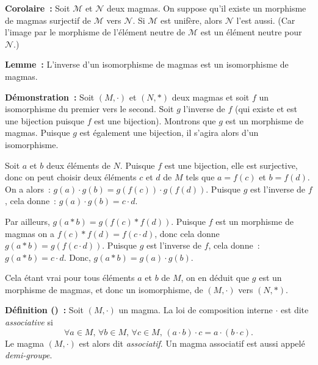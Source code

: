     \hfill \square

\medskip

\noindent\textbf{Corolaire :} Soit $\mathcal{M}$ et $\mathcal{N}$ deux magmas. 
    On suppose qu'il existe un morphisme de magmas surjectif de $\mathcal{M}$ vers $\mathcal{N}$. 
    Si $\mathcal{M}$ est unifère, alors $\mathcal{N}$ l'est aussi. 
    (Car l'image par le morphisme de l'élément neutre de $\mathcal{M}$ est un élément neutre pour $\mathcal{N}$.)

\medskip

\noindent\textbf{Lemme :} L'inverse d'un isomorphisme de magmas est un isomorphisme de magmas.

\medskip

\noindent\textbf{Démonstration :} Soit $\left(M, \cdot \right)$ et $\left(N, \ast \right)$ deux magmas et soit $f$ un isomorphisme du premier vers le second. 
    Soit $g$ l'inverse de $f$ (qui existe et est une bijection puisque $f$ est une bijection). 
    Montrons que $g$ est un morphisme de magmas. 
    Puisque $g$ est également une bijection, il s'agira alors d'un isomorphisme. 

    Soit $a$ et $b$ deux éléments de $N$. 
    Puisque $f$ est une bijection, elle est surjective, donc on peut choisir deux éléments $c$ et $d$ de $M$ tels que $a = f(c)$ et $b = f(d)$. 
    On a alors : $g(a) \cdot g(b) = g(f(c)) \cdot g(f(d))$.
    Puisque $g$ est l'inverse de $f$, cela donne : $g(a) \cdot g(b) = c \cdot d$. 

    Par ailleurs, $g(a \ast b) = g(f(c) \ast f(d))$. 
    Puisque $f$ est un morphisme de magmas on a $f(c) \ast f(d) = f (c \cdot d)$, donc cela donne $g(a \ast b) = g(f(c \cdot d))$.
    Puisque $g$ est l'inverse de $f$, cela donne : $g(a \ast b) = c \cdot d$. 
    Donc, $g(a \ast b) = g(a) \cdot g(b)$. 

    Cela étant vrai pour tous éléments $a$ et $b$ de $M$, on en déduit que $g$ est un morphisme de magmas, et donc un isomorphisme, de $\left(M, \cdot \right)$ vers $\left(N, \ast \right)$.

    \hfill \square

\medskip

\noindent\textbf{Définition () :} Soit $(M,\cdot)$ un magma.
    La loi de composition interne $\cdot$ est dite \textit{associative} si
    \begin{equation*}
        \forall a \in M, \, \forall b \in M, \, \forall c \in M , \,  
        (a \cdot b) \cdot c = a \cdot (b \cdot c).
    \end{equation*}
    Le magma $(M, \cdot)$ est alors dit \textit{associatif}. 
    Un magma associatif est aussi appelé \textit{demi-groupe}.

